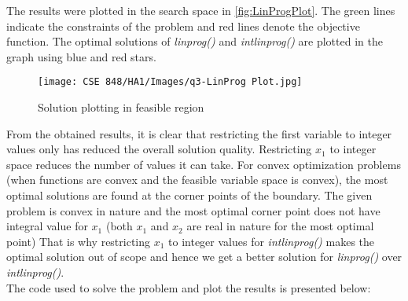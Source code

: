 \documentclass{article}
\begin{document}
The results were plotted in the search space in \autoref{fig:LinProgPlot}. The green lines indicate the constraints of the problem and red lines denote the objective function. The optimal solutions of \textit{linprog()} and \textit{intlinprog()} are plotted in the graph using blue and red stars.\\

\begin{figure}[H]
    \centering
    \texttt{[image: CSE 848/HA1/Images/q3-LinProg Plot.jpg]}
    \caption{Solution plotting in feasible region}
    \label{fig:LinProgPlot}
\end{figure}

From the obtained results, it is clear that restricting the first variable to integer values only has reduced the overall solution quality. Restricting $x_{1}$ to integer space reduces the number of values it can take. For convex optimization problems (when functions are convex and the feasible variable space is convex), the most optimal solutions are found at the corner points of the boundary. The given problem is convex in nature and the most optimal corner point does not have integral value for $x_1$ (both $x_1$ and $x_2$ are real in nature for the most optimal point) That is why restricting $x_1$ to integer values for \textit{intlinprog()} makes the optimal solution out of scope and hence we get a better solution for \textit{linprog()} over \textit{intlinprog()}.\\

The code used to solve the problem and plot the results is presented below:

\end{document}
